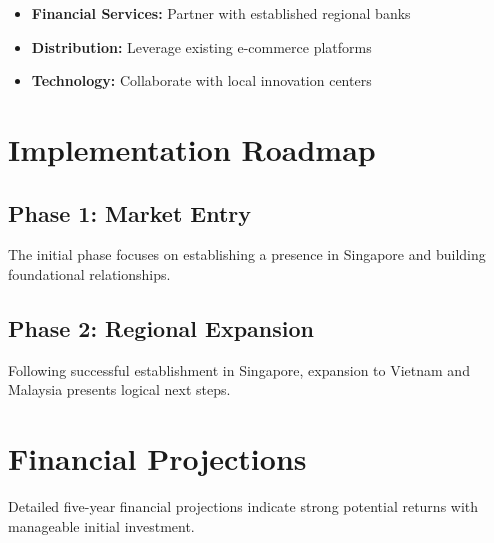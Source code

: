 \documentclass[11pt,a4paper]{article}
\begin{document}
\begin{itemize}
  \item \textbf{Financial Services:} Partner with established regional banks
  \item \textbf{Distribution:} Leverage existing e-commerce platforms
  \item \textbf{Technology:} Collaborate with local innovation centers
\end{itemize}

\lipsum[5]

\section{Implementation Roadmap}

\subsection{Phase 1: Market Entry}

The initial phase focuses on establishing a presence in Singapore and building foundational relationships.

\lipsum[6]

\subsection{Phase 2: Regional Expansion}

Following successful establishment in Singapore, expansion to Vietnam and Malaysia presents logical next steps.

\lipsum[7]

\section{Financial Projections}

Detailed five-year financial projections indicate strong potential returns with manageable initial investment.

\lipsum[8]
\end{document}
